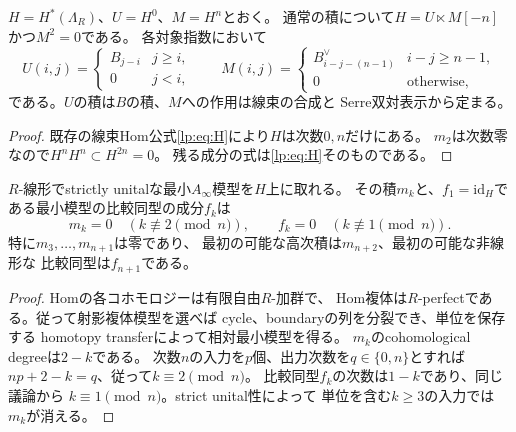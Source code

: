 \begin{proposition}
\label{prop:ainfty-squarezero}
$H=H^*(\Lambda_R)$、$U=H^0$、$M=H^n$とおく。
通常の積について$H=U\ltimes M[-n]$かつ$M^2=0$である。
各対象指数において
\[
 U(i,j)=
 \begin{cases}B_{j-i}&j\ge i,\\0&j<i,\end{cases}\qquad
 M(i,j)=
 \begin{cases}B_{i-j-(n-1)}^\vee&i-j\ge n-1,\\
 0&\text{otherwise},\end{cases}
 \tag{SQ}\label{eq:ainfty-sq}
\]
である。$U$の積は$B$の積、$M$への作用は線束の合成と
Serre双対表示から定まる。
\end{proposition}
\begin{proof}
既存の線束Hom公式\eqref{lp:eq:H}により$H$は次数$0,n$だけにある。
$m_2$は次数零なので$H^nH^n\subset H^{2n}=0$。
残る成分の式は\eqref{lp:eq:H}そのものである。
\end{proof}

\begin{proposition}[相対最小模型の高次演算の間隙]
\label{prop:ainfty-arity}
$R$-線形でstrictly unitalな最小$A_\infty$模型を$H$上に取れる。
その積$m_k$と、$f_1=\mathrm{id}_H$である最小模型の比較同型の成分$f_k$は
\[
 m_k=0\quad(k\not\equiv2\!\!\!\pmod n),\qquad
 f_k=0\quad(k\not\equiv1\!\!\!\pmod n).
 \tag{AR}\label{eq:ainfty-arity}
\]
特に$m_3,\ldots,m_{n+1}$は零であり、
最初の可能な高次積は$m_{n+2}$、最初の可能な非線形な
比較同型は$f_{n+1}$である。
\end{proposition}
\begin{proof}
Homの各コホモロジーは有限自由$R$-加群で、
Hom複体は$R$-perfectである。従って射影複体模型を選べば
cycle、boundaryの列を分裂でき、単位を保存する
homotopy transferによって相対最小模型を得る。
$m_k$のcohomological degreeは$2-k$である。
次数$n$の入力を$p$個、出力次数を$q\in\{0,n\}$とすれば
$np+2-k=q$、従って$k\equiv2\pmod n$。
比較同型$f_k$の次数は$1-k$であり、同じ議論から
$k\equiv1\pmod n$。strict unital性によって
単位を含む$k\ge3$の入力では$m_k$が消える。
\end{proof}

